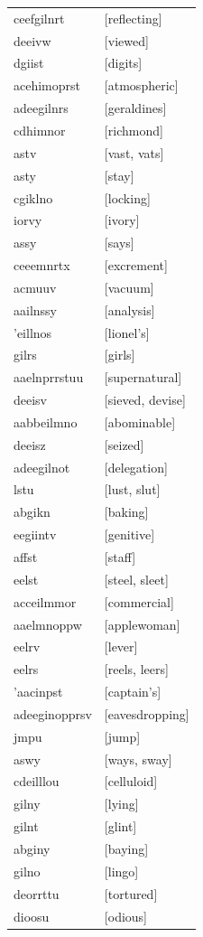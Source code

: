 \documentclass{article}
\begin{document}
\begin{tabular}{ll}
ceefgilnrt & [reflecting] \\
deeivw & [viewed] \\
dgiist & [digits] \\
acehimoprst & [atmospheric] \\
adeegilnrs & [geraldines] \\
cdhimnor & [richmond] \\
astv & [vast, vats] \\
asty & [stay] \\
cgiklno & [locking] \\
iorvy & [ivory] \\
assy & [says] \\
ceeemnrtx & [excrement] \\
acmuuv & [vacuum] \\
aailnssy & [analysis] \\
'eillnos & [lionel's] \\
gilrs & [girls] \\
aaelnprrstuu & [supernatural] \\
deeisv & [sieved, devise] \\
aabbeilmno & [abominable] \\
deeisz & [seized] \\
adeegilnot & [delegation] \\
lstu & [lust, slut] \\
abgikn & [baking] \\
eegiintv & [genitive] \\
affst & [staff] \\
eelst & [steel, sleet] \\
acceilmmor & [commercial] \\
aaelmnoppw & [applewoman] \\
eelrv & [lever] \\
eelrs & [reels, leers] \\
'aacinpst & [captain's] \\
adeeginopprsv & [eavesdropping] \\
jmpu & [jump] \\
aswy & [ways, sway] \\
cdeilllou & [celluloid] \\
gilny & [lying] \\
gilnt & [glint] \\
abginy & [baying] \\
gilno & [lingo] \\
deorrttu & [tortured] \\
dioosu & [odious] \\

\end{tabular}
\end{document}
